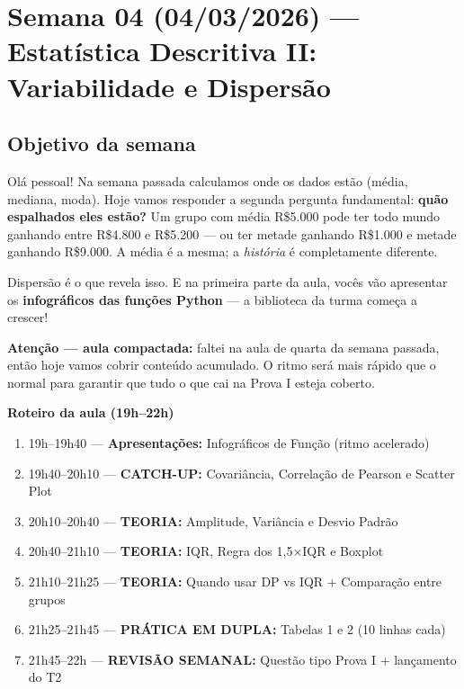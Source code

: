 
\chapter{Semana 04 (04/03/2026) — Estatística Descritiva II: Variabilidade e Dispersão}

\section{Objetivo da semana}

Olá pessoal! Na semana passada calculamos onde os dados estão (média, mediana,
moda). Hoje vamos responder a segunda pergunta fundamental: \textbf{quão
espalhados eles estão?} Um grupo com média R\$5.000 pode ter todo mundo
ganhando entre R\$4.800 e R\$5.200 — ou ter metade ganhando R\$1.000 e metade
ganhando R\$9.000. A média é a mesma; a \emph{história} é completamente diferente.

Dispersão é o que revela isso. E na primeira parte da aula, vocês vão apresentar
os \textbf{infográficos das funções Python} — a biblioteca da turma começa a crescer!

\begin{NoteBox}
\textbf{Atenção — aula compactada:} faltei na aula de quarta da semana passada,
então hoje vamos cobrir conteúdo acumulado. O ritmo será mais rápido que o
normal para garantir que tudo o que cai na Prova I esteja coberto.
\end{NoteBox}

\begin{BoardBox}
\textbf{Roteiro da aula (19h–22h)}
\begin{enumerate}
  \item 19h–19h40 — \textbf{Apresentações:} Infográficos de Função (ritmo acelerado)
  \item 19h40–20h10 — \textbf{CATCH-UP:} Covariância, Correlação de Pearson e Scatter Plot
  \item 20h10–20h40 — \textbf{TEORIA:} Amplitude, Variância e Desvio Padrão
  \item 20h40–21h10 — \textbf{TEORIA:} IQR, Regra dos 1,5×IQR e Boxplot
  \item 21h10–21h25 — \textbf{TEORIA:} Quando usar DP vs IQR + Comparação entre grupos
  \item 21h25–21h45 — \textbf{PRÁTICA EM DUPLA:} Tabelas 1 e 2 (10 linhas cada)
  \item 21h45–22h — \textbf{REVISÃO SEMANAL:} Questão tipo Prova I + lançamento do T2
\end{enumerate}
\end{BoardBox}


